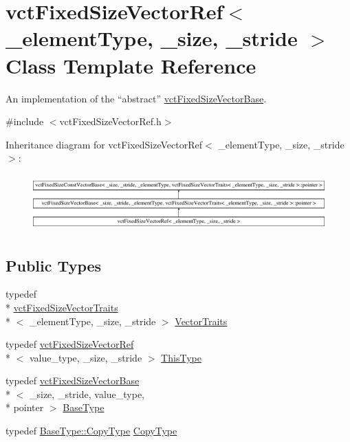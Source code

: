 \hypertarget{classvct_fixed_size_vector_ref}{\section{vct\-Fixed\-Size\-Vector\-Ref$<$ \-\_\-element\-Type, \-\_\-size, \-\_\-stride $>$ Class Template Reference}
\label{classvct_fixed_size_vector_ref}
}


An implementation of the ``abstract'' \hyperlink{classvct_fixed_size_vector_base}{vct\-Fixed\-Size\-Vector\-Base}.  




{\ttfamily \#include $<$vct\-Fixed\-Size\-Vector\-Ref.\-h$>$}

Inheritance diagram for vct\-Fixed\-Size\-Vector\-Ref$<$ \-\_\-element\-Type, \-\_\-size, \-\_\-stride $>$\-:\begin{figure}[H]
\begin{center}
\leavevmode
\includegraphics[height=2.213439cm]{df/de2/classvct_fixed_size_vector_ref}
\end{center}
\end{figure}
\subsection*{Public Types}
\begin{DoxyCompactItemize}
\item 
typedef \\*
\hyperlink{classvct_fixed_size_vector_traits}{vct\-Fixed\-Size\-Vector\-Traits}\\*
$<$ \-\_\-element\-Type, \-\_\-size, \-\_\-stride $>$ \hyperlink{classvct_fixed_size_vector_ref_a9061c9a151a2e67a207cdff219e165b4}{Vector\-Traits}
\item 
typedef \hyperlink{classvct_fixed_size_vector_ref}{vct\-Fixed\-Size\-Vector\-Ref}\\*
$<$ value\-\_\-type, \-\_\-size, \-\_\-stride $>$ \hyperlink{classvct_fixed_size_vector_ref_a3fc8fbdfc7492a38119e7ed7ef5bc289}{This\-Type}
\item 
typedef \hyperlink{classvct_fixed_size_vector_base}{vct\-Fixed\-Size\-Vector\-Base}\\*
$<$ \-\_\-size, \-\_\-stride, value\-\_\-type, \\*
pointer $>$ \hyperlink{classvct_fixed_size_vector_ref_a333e56f4164c12e33aff3e491d4fb879}{Base\-Type}
\item 
typedef \hyperlink{classvct_fixed_size_vector_base_a136da6f4bb90964f3f156533f85416d9}{Base\-Type\-::\-Copy\-Type} \hyperlink{classvct_fixed_size_vector_ref_a43b5dfaa1ac96d6e47aaa9e44b4d7f92}{Copy\-Type}
\end{DoxyCompactItemize}
